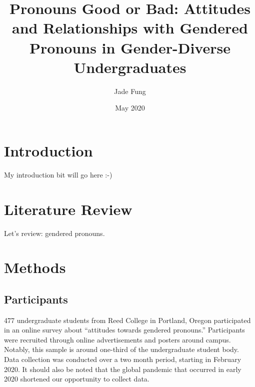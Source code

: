 \documentclass[12pt,twoside]{reedthesis}
\title{Pronouns Good or Bad: Attitudes and Relationships with Gendered Pronouns in Gender-Diverse Undergraduates}
\author{Jade Fung}
\date{May 2020}
\begin{document}
  \maketitle

\frontmatter %
\pagestyle{empty} %



  \hypersetup{linkcolor=black}
  \setcounter{tocdepth}{2}
  \tableofcontents

  \listoftables

  \listoffigures



\mainmatter %
\pagestyle{fancyplain} %

\hypertarget{introduction}{%
\chapter*{Introduction}\label{introduction}}

My introduction bit will go here :-)

\hypertarget{literature-review}{%
\chapter{Literature Review}\label{literature-review}}

Let's review: gendered pronouns.

\hypertarget{methods}{%
\chapter{Methods}\label{methods}}

\hypertarget{participants}{%
\section{Participants}\label{participants}}

477 undergraduate students from Reed College in Portland, Oregon participated in an online survey about ``attitudes towards gendered pronouns.'' Participants were recruited through online advertisements and posters around campus. Notably, this sample is around one-third of the undergraduate student body. Data collection was conducted over a two month period, starting in February 2020. It should also be noted that the global pandemic that occurred in early 2020 shortened our opportunity to collect data.
\end{document}
